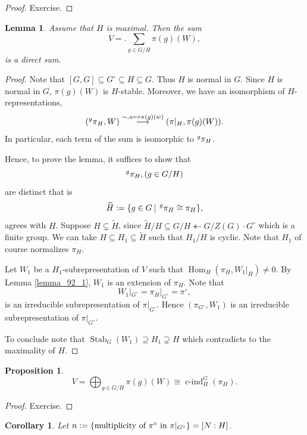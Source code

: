\documentclass[8pt]{article}
\newtheorem{proposition}{Proposition}[section]
\newtheorem{lemma}{Lemma}[section]
\newtheorem{corollary}{Corollary} [section]
\DeclareMathOperator{\Stab}{Stab}
\DeclareMathOperator{\cind}{c-ind}
\DeclareMathOperator{\Hom}{Hom}
\newcommand{\defeq}{\vcentcolon=}
\newcommand{\sep}[0]{\:|\:}
\begin{document}
  \begin{proof}
    Exercise.
  \end{proof}
  \begin{lemma}
    \label{lemma_92}
    Assume that $H$ is maximal. Then the sum 
    \begin{equation*}
      V=. \sum_{g\in G/H}\pi(g)(W),
    \end{equation*}
    is a direct sum.
  \end{lemma}
  \begin{proof}
    Note that $[G,G]\subseteq G^\circ\subseteq H\subseteq G$. Thus $H$ is normal in $G$.
    Since $H$ is normal in $G$, $\pi(g)(W)$ is $H$-stable. Moreover, we have an isomorphism of $H$-representations,
    \begin{equation*}
      (\prescript{g}{}{\pi_H},W)\stackrel{\sim, w\mapsto\pi(g)(w)}{\longrightarrow}(\pi|_H,\pi(g)(W)).
    \end{equation*}
    In particular, each term of the sum is isomorphic to $\prescript{g}{}{\pi_H}$.
    \par Hence, to prove the lemma, it suffices to show that 
    \begin{equation*}
      \prescript{g}{}{\pi_H},(g\in G/H)
    \end{equation*}
    are distinct that is 
    \begin{equation*}
      \widetilde{H}\defeq \{g\in G\sep \prescript{g}{}{\pi_H}\cong \pi_H\},
    \end{equation*}
    agrees with $H$. Suppose $H\subsetneq \widetilde{H}$, since $\widetilde{H}/H\subseteq G/H \twoheadleftarrow G/Z(G)\cdot G^\circ$ which is a finite group. We can take $H \subseteq H_1\subseteq \widetilde{H}$ such that $H_1/H$ is cyclic. Note that $H_1$ of course normalizes $\pi_H$.
    \par Let $W_1$ be a $H_1$-subrepresentation of $V$ such that $\Hom_H(\pi_H,W_1|_H)\not=0$. By Lemma \ref{lemma_92_1}, $W_1$ is an extension of $\pi_H$. Note that 
    \begin{equation*}
      W_1|_{G^\circ} = \pi_H|_{G^\circ}=\pi^\circ,
    \end{equation*}
    is an irreducible subrepresentation of $\pi|_{G^\circ}$. Hence $(\pi_{G^\circ},W_1)$ is an irreducible subrepresentation of $\pi|_{G^\circ}$.
    \par To conclude note that $\Stab_G(W_1)\supseteq H_1\supsetneq H$ which contradicts to the maximality of $H$. 
  \end{proof}
  \begin{proposition}
    \begin{equation*}
      V = \bigoplus_{g\in G/H}\pi(g)(W)\cong \cind_H^G(\pi_H).
    \end{equation*}
  \end{proposition}
  \begin{proof}
    Exercise.
  \end{proof}
  \begin{corollary}
    \label{corollary_93}
    Let $n\defeq \{\text{multiplicity of $\pi^\circ$ in $\pi|_{G^\circ}$}\} = [N:H]$. 
  \end{corollary}
\end{document}
